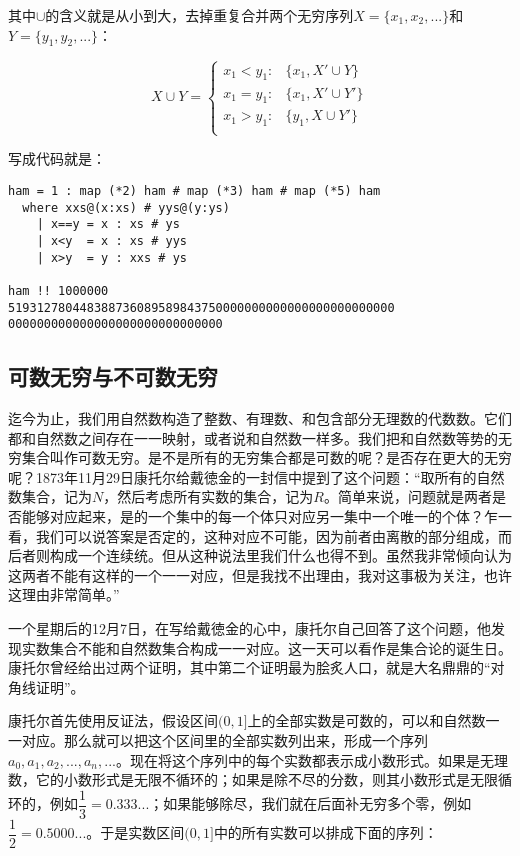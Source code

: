 \documentclass{article}
\begin{document}
其中$\cup$的含义就是从小到大，去掉重复合并两个无穷序列$X = \{x_1, x_2, ...\}$和$Y = \{y_1, y_2, ...\}$：

\[
X \cup Y =
\begin{cases}
x_1 < y_1 : & \{x_1, X' \cup Y \} \\
x_1 = y_1 : & \{x_1, X' \cup Y' \} \\
x_1 > y_1 : & \{y_1, X \cup Y' \} \\
\end{cases}
\]

写成代码就是：

\begin{lstlisting}
ham = 1 : map (*2) ham # map (*3) ham # map (*5) ham
  where xxs@(x:xs) # yys@(y:ys)
    | x==y = x : xs # ys
    | x<y  = x : xs # yys
    | x>y  = y : xxs # ys

ham !! 1000000
519312780448388736089589843750000000000000000000000000
000000000000000000000000000000
\end{lstlisting}

\lstset{frame=none}

\subsection{可数无穷与不可数无穷}
迄今为止，我们用自然数构造了整数、有理数、和包含部分无理数的代数数。它们都和自然数之间存在一一映射，或者说和自然数一样多。我们把和自然数等势的无穷集合叫作可数无穷。是不是所有的无穷集合都是可数的呢？是否存在更大的无穷呢？1873年11月29日康托尔给戴徳金的一封信中提到了这个问题：“取所有的自然数集合，记为$N$，然后考虑所有实数的集合，记为$R$。简单来说，问题就是两者是否能够对应起来，是的一个集中的每一个体只对应另一集中一个唯一的个体？乍一看，我们可以说答案是否定的，这种对应不可能，因为前者由离散的部分组成，而后者则构成一个连续统。但从这种说法里我们什么也得不到。虽然我非常倾向认为这两者不能有这样的一个一一对应，但是我找不出理由，我对这事极为关注，也许这理由非常简单。”

一个星期后的12月7日，在写给戴徳金的心中，康托尔自己回答了这个问题，他发现实数集合不能和自然数集合构成一一对应。这一天可以看作是集合论的诞生日。康托尔曾经给出过两个证明，其中第二个证明最为脍炙人口，就是大名鼎鼎的“对角线证明”。

康托尔首先使用反证法，假设区间$(0, 1]$上的全部实数是可数的，可以和自然数一一对应。那么就可以把这个区间里的全部实数列出来，形成一个序列$a_0, a_1, a_2, ..., a_n, ...$。现在将这个序列中的每个实数都表示成小数形式。如果是无理数，它的小数形式是无限不循环的；如果是除不尽的分数，则其小数形式是无限循环的，例如$\dfrac{1}{3} = 0.333...$；如果能够除尽，我们就在后面补无穷多个零，例如$\dfrac{1}{2} = 0.5000...$。于是实数区间$(0, 1]$中的所有实数可以排成下面的序列：
\end{document}
